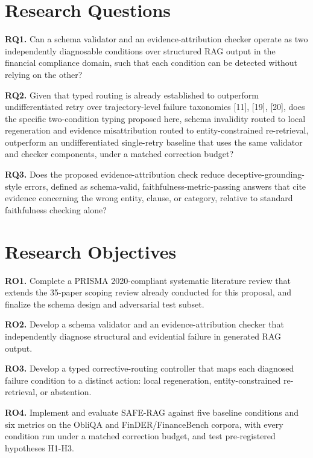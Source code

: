 \documentclass[11pt,a4paper]{article}
\begin{document}
\section{Research Questions}

\textbf{RQ1.} Can a schema validator and an evidence-attribution checker operate as two
independently diagnosable conditions over structured RAG output in the financial
compliance domain, such that each condition can be detected without relying on the other?

\textbf{RQ2.} Given that typed routing is already established to outperform
undifferentiated retry over trajectory-level failure taxonomies [11], [19], [20], does
the specific two-condition typing proposed here, schema invalidity routed to local
regeneration and evidence misattribution routed to entity-constrained re-retrieval,
outperform an undifferentiated single-retry baseline that uses the same validator and
checker components, under a matched correction budget?

\textbf{RQ3.} Does the proposed evidence-attribution check reduce
deceptive-grounding-style errors, defined as schema-valid, faithfulness-metric-passing
answers that cite evidence concerning the wrong entity, clause, or category, relative to
standard faithfulness checking alone?

\section{Research Objectives}

\textbf{RO1.} Complete a PRISMA 2020-compliant systematic literature review that extends
the 35-paper scoping review already conducted for this proposal, and finalize the schema
design and adversarial test subset.

\textbf{RO2.} Develop a schema validator and an evidence-attribution checker that
independently diagnose structural and evidential failure in generated RAG output.

\textbf{RO3.} Develop a typed corrective-routing controller that maps each diagnosed
failure condition to a distinct action: local regeneration, entity-constrained
re-retrieval, or abstention.

\textbf{RO4.} Implement and evaluate SAFE-RAG against five baseline conditions and six
metrics on the ObliQA and FinDER/FinanceBench corpora, with every condition run under a
matched correction budget, and test pre-registered hypotheses H1-H3.
\end{document}
